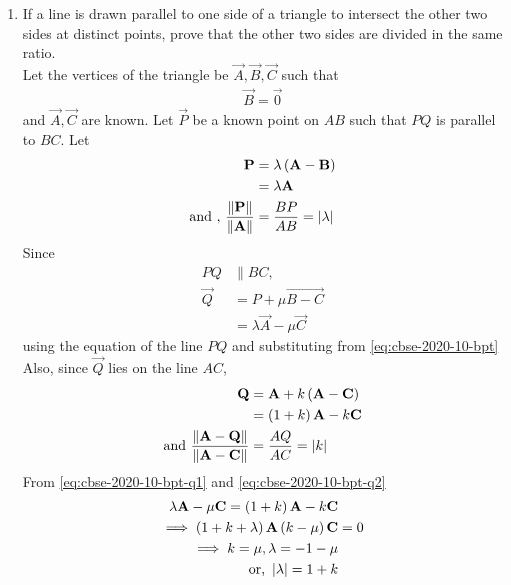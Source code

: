 \documentclass[journal,12pt,twocolumn]{IEEEtran}
\begin{document}
\begin{enumerate}
\begin{figure}
	  \caption{}
	  \label{fig:matrix-10-9.pdf}
	  \end{figure}
    \item If a line is drawn parallel to one side of a triangle to intersect the other two sides at distinct points, prove that the other two sides are divided in the same ratio.\\
	    \solution Let the vertices of the triangle be $\vec{A}, \vec{B}, \vec{C}$ such that  
		\begin{align}
			\vec{B} =\vec{0} 
		\end{align}
		and $\vec{A}, \vec{C}$ are known. Let $\vec{P}$ be a known point on $AB$ such that $PQ$ is parallel to $BC$.  Let 
		\begin{align}
			\mathbf{P} &= \lambda \left(\mathbf{A} -\mathbf{B} \right)
			\\
			&=\lambda 
			 \mathbf{A} 
			\label{eq:cbse-2020-10-bpt}
			\\
			\text{and , } \frac{\left\lVert\mathbf{P} 
			\right\rVert}{\left\lVert\mathbf{A}\right\rVert } &= \frac{BP}{AB}= \left\vert\lambda\right\vert
			\label{eq:cbse-2020-10-bpt-pa}
		\end{align}
		Since 
		\begin{align}
			PQ &\parallel BC,
			\\
			\vec{Q} &= P + \mu \vec{B-C}
			\\
			&= \lambda \vec{A} - \mu \vec{C}
			\label{eq:cbse-2020-10-bpt-q1}
		\end{align}
		using the equation of the line $PQ$  and substituting from 
			\eqref{eq:cbse-2020-10-bpt}
			Also, since $\vec{Q}$  lies on the line $AC$, 
		\begin{align}
			\mathbf{Q} &= \mathbf{A} + k \left(\mathbf{A}-\mathbf{C}\right)
			\\
			&= \left(1 + k\right)\mathbf{A} - k \mathbf{C}
			\label{eq:cbse-2020-10-bpt-q2}
			\\
			\text{and }\frac{\left\lVert{\mathbf{A}-\mathbf{Q}}\right\rVert}{\left\lVert{\mathbf{A}-\mathbf{C}}\right\rVert} &= \frac{AQ}{AC}= \left\vert k\right\vert
			\label{eq:cbse-2020-10-bpt-q2k}
		\end{align}
			From \eqref{eq:cbse-2020-10-bpt-q1} and 
			\eqref{eq:cbse-2020-10-bpt-q2}
		\begin{align}
			\lambda \vec{A} - \mu \vec{C}	= 
			 \brak{1 + k}\vec{A} - k \vec{C}&
			\\
			\implies 
			\brak{1 + k+\lambda }\vec{A} \brak{k - \mu}  \vec{C}	&=  0
			\\
			\implies k = \mu, \lambda = -1 - \mu 
			\\
			\text{or, } \abs{\lambda } = 1 + k
			\label{eq:cbse-2020-10-bpt-q2-lk}

\end{align}
\end{enumerate}
\end{document}

